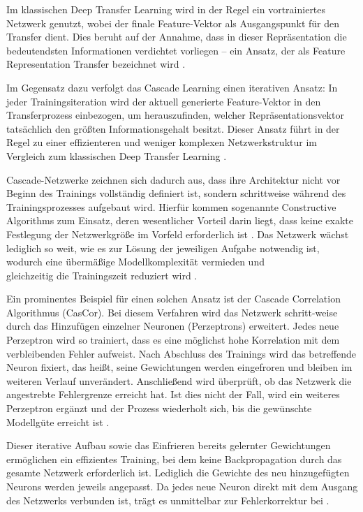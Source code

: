 Im klassischen Deep Transfer Learning wird in der Regel ein vortrainiertes Netzwerk genutzt, wobei der finale Feature-Vektor als Ausgangspunkt 
für den Transfer dient. Dies beruht auf der Annahme, dass in dieser Repräsentation die bedeutendsten Informationen verdichtet vorliegen – ein 
Ansatz, der als Feature Representation Transfer bezeichnet wird \cite{survey_transfer}.

Im Gegensatz dazu verfolgt das Cascade Learning einen iterativen Ansatz: In jeder Trainingsiteration wird der aktuell generierte Feature-Vektor 
in den Transferprozess einbezogen, um herauszufinden, welcher Repräsentationsvektor tatsächlich den größten Informationsgehalt besitzt. Dieser 
Ansatz führt in der Regel zu einer effizienteren und weniger komplexen Netzwerkstruktur im Vergleich zum klassischen Deep Transfer Learning 
\cite{phd_deep_cascade}.

Cascade-Netzwerke zeichnen sich dadurch aus, dass ihre Architektur nicht vor Beginn des Trainings vollständig definiert ist, sondern 
schrittweise während des Trainingsprozesses aufgebaut wird. Hierfür kommen sogenannte Constructive Algorithms zum Einsatz, deren wesentlicher 
Vorteil darin liegt, dass keine exakte Festlegung der Netzwerkgröße im Vorfeld erforderlich ist \cite{Constructive_Cascade}. Das Netzwerk wächst 
lediglich so weit, wie es zur Lösung der jeweiligen Aufgabe notwendig ist, wodurch eine übermäßige Modellkomplexität vermieden und \\gleichzeitig 
die Trainingszeit reduziert wird \cite{Constructive_Cascade, cascor}.

Ein prominentes Beispiel für einen solchen Ansatz ist der Cascade Correlation Algorithmus (CasCor). Bei diesem Verfahren wird das Netzwerk schritt-weise 
durch das Hinzufügen einzelner Neuronen (Perzeptrons) erweitert. Jedes neue Perzeptron wird so trainiert, dass es eine möglichst hohe 
Korrelation mit dem verbleibenden Fehler aufweist. Nach Abschluss des Trainings wird das betreffende Neuron fixiert, das heißt, seine 
Gewichtungen werden eingefroren und bleiben im weiteren Verlauf unverändert. Anschließend wird überprüft, ob das Netzwerk die angestrebte 
Fehlergrenze erreicht hat. Ist dies nicht der Fall, wird ein weiteres Perzeptron ergänzt und der Prozess wiederholt sich, bis die gewünschte 
Modellgüte erreicht ist \cite{cascor}.

Dieser iterative Aufbau sowie das Einfrieren bereits gelernter Gewichtungen ermöglichen ein effizientes Training, bei dem keine Backpropagation 
durch das gesamte Netzwerk erforderlich ist. Lediglich die Gewichte des neu hinzugefügten Neurons werden jeweils angepasst. Da jedes neue 
Neuron direkt mit dem Ausgang des Netzwerks verbunden ist, trägt es unmittelbar zur Fehlerkorrektur bei \cite{cascor}.

